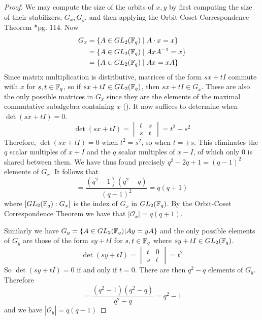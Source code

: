 \documentclass{amsart}
\begin{document}
\begin{proof}
    We may compute the size of the orbits of $x, y$ by first computing the size of their stabilizers, $G_x, G_y$, and then applying the Orbit-Coset Correspondence Theorem \cite{DandF}*{pg. 114}.
    Now
    \begin{align*}
        G_x &= \{A \in GL_2(\protect\mathbb{F}_q) \mid A \cdot x = x\} \\
            &= \{A \in GL_2(\protect\mathbb{F}_q) \mid AxA^{-1} = x\} \\
            &= \{A \in GL_2(\protect\mathbb{F}_q) \mid Ax = xA\} 
    \end{align*}
    Since matrix multiplication is distributive, matrices of the form $sx + tI$ commute with $x$ for $s,t \in \protect\mathbb{F}_q$, so if $sx + tI \in GL_2(\protect\mathbb{F}_q)$, then $sx + tI \in G_x$. These are also the only possible matrices in $G_x$ since they are the elements of the maximal commutative subalgebra containing $x$ (). It now suffices to determine when $\det(sx + tI) = 0$.
    \begin{equation*}
        \det(sx+tI) =
        \begin{vmatrix}
            t & s \\
            s & t
        \end{vmatrix} = t^2 - s^2
    \end{equation*}
    Therefore, $\det(sx + tI) = 0$ when $t^2 = s^2$, so when $t = \pm s$. This eliminates the $q$ scalar multiples of $x + I$ and the $q$ scalar multiples of $x - I$, of which only $0$ is shared between them. We have thus found precisely $q^2 - 2q + 1 = (q-1)^2$ elements of $G_x$. It follows that
    \begin{equation*}
        [GL_2(\bF_q) : G_x] = \frac{(q^2-1)(q^2-q)}{(q-1)^2} = q(q + 1)
    \end{equation*}
    where $[GL_2(\protect\mathbb{F}_q) : G_x]$ is the index of $G_x$ in $GL_2(\protect\mathbb{F}_q)$. By the Orbit-Coset Correspondence Theorem we have that $|\mathcal{O}_x| = q(q + 1)$.

    Similarly we have $G_y = \{A \in GL_2(\protect\mathbb{F}_q) | Ay = yA\}$ and the only possible elements of $G_y$ are those of the form $sy + tI$ for $s,t \in \protect\mathbb{F}_q$ where $sy+tI \in GL_2(\protect\mathbb{F}_q)$.
    \begin{equation*}
        \det(sy+tI) =
        \begin{vmatrix}
            t & 0 \\
            s & t
        \end{vmatrix} = t^2
    \end{equation*}
    So $\det(sy + tI) = 0$ if and only if $t = 0$. There are then $q^2 - q$ elements of $G_y$. Therefore
    \begin{equation*}
        [GL_2(\bF_q) : G_y] = \frac{(q^2-1)(q^2-q)}{q^2 - q} = q^2 - 1
    \end{equation*}
    and we have $|\mathcal{O}_y| = q(q - 1)$
\end{proof}
\end{document}
